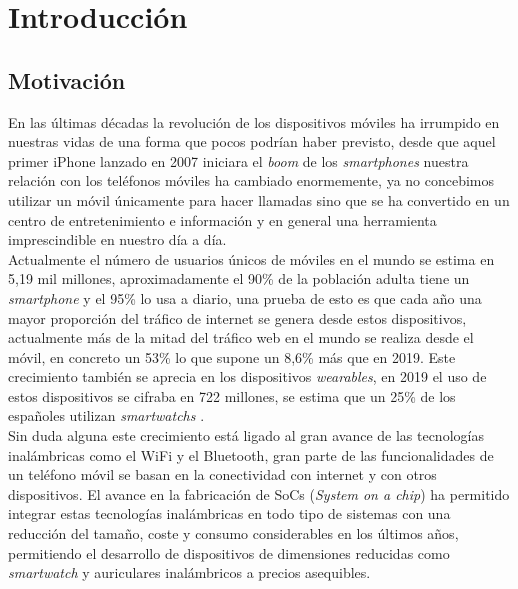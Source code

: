 \documentclass[../proyecto.tex]{subfiles}
\begin{document}
\chapter{Introducción}
\section{Motivación}

En las últimas décadas la revolución de los dispositivos móviles ha irrumpido en nuestras vidas de una forma que pocos podrían haber previsto, desde que aquel primer iPhone lanzado en 2007 iniciara el \textit{boom} de los \textit{smartphones} nuestra relación con los teléfonos móviles ha cambiado enormemente, ya no concebimos utilizar un móvil únicamente para hacer llamadas sino que se ha convertido en un centro de entretenimiento e información y en general una herramienta imprescindible en nuestro día a día.\\

Actualmente el número de usuarios únicos de móviles en el mundo se estima en 5,19 mil millones, aproximadamente el 90\% de la población adulta tiene un \textit{smartphone} y el 95\% lo usa a diario, una prueba de esto es que cada año una mayor proporción del tráfico de internet se genera desde estos dispositivos, actualmente más de la mitad del tráfico web en el mundo se realiza desde el móvil, en concreto un 53\% lo que supone un 8,6\% más que en 2019. Este crecimiento también se aprecia en los dispositivos \textit{wearables}, en 2019 el uso de estos dispositivos se cifraba en 722 millones, se estima que un 25\% de los españoles utilizan  \textit{smartwatchs} \cite{informe_ditendria}.\\

Sin duda alguna este crecimiento está ligado al gran avance de las tecnologías inalámbricas como el WiFi y el Bluetooth, gran parte de las funcionalidades de un teléfono móvil se basan en la conectividad con internet y con otros dispositivos. El avance en la fabricación de SoCs (\textit{System on a chip}) ha permitido integrar estas tecnologías inalámbricas en todo tipo de sistemas con una reducción del tamaño, coste y consumo considerables en los últimos años, permitiendo el desarrollo de dispositivos de dimensiones reducidas como \textit{smartwatch} y auriculares inalámbricos a precios asequibles.\\
\end{document}
